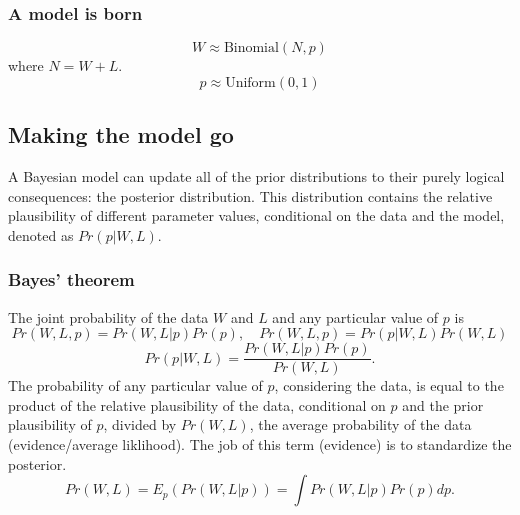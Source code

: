 \documentclass[11pt]{article}
\begin{document}
\subsubsection{A model is born}
\label{sec:orgfce0624}
$$
W \approx \textrm{Binomial}(N, p)
$$
where \(N = W + L\).
$$
p \approx \textrm{Uniform}(0, 1)
$$
\subsection{Making the model go}
\label{sec:orgeb1dfeb}
A Bayesian model can update all of the prior distributions to their purely
logical consequences: the posterior distribution. This distribution contains the
relative plausibility of different parameter values, conditional on the data and
the model, denoted as \(Pr(p | W, L)\).
\subsubsection{Bayes' theorem}
\label{sec:org7cfe9e8}
The joint probability of the data \(W\) and \(L\) and any particular value of \(p\) is
$$
Pr(W, L, p)= Pr(W, L | p) Pr(p), \quad 
Pr(W, L, p)= Pr(p | W, L) Pr(W, L)
$$
$$
Pr(p | W, L) = \frac{Pr(W, L | p)Pr(p)}{Pr(W, L)}.
$$
The probability of any particular value of \(p\), considering the data, is equal
to the product of the relative plausibility of the data, conditional on \(p\) and
the prior plausibility of \(p\), divided by \(Pr(W, L)\), the average probability of
the data (evidence/average liklihood). The job of this term (evidence) is to
standardize the posterior.
$$
Pr(W, L) = E_p(Pr(W, L | p)) = \int Pr(W, L | p) Pr(p) dp.
$$
\end{document}
